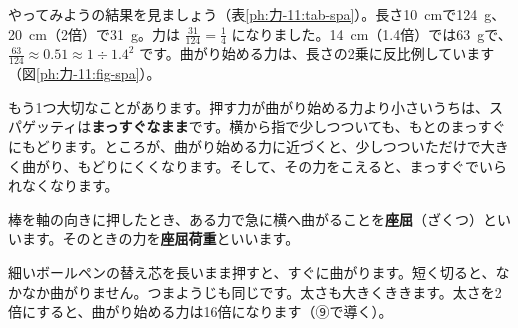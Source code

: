 

\label{ph:力-11:sec1}やってみようの結果を見ましょう（表\ref{ph:力-11:tab-spa}）。長さ\qty{10}{cm}で\qty{124}{g}、\qty{20}{cm}（2倍）で\qty{31}{g}。力は $\tfrac{31}{124}=\tfrac{1}{4}$ になりました。\qty{14}{cm}（1.4倍）では\qty{63}{g}で、$\tfrac{63}{124}\approx0.51\approx1\div1.4^2$ です。曲がり始める力は、長さの2乗に反比例しています（図\ref{ph:力-11:fig-spa}）。

\noindent\begin{minipage}[c]{0.50\linewidth}
もう1つ大切なことがあります。押す力が曲がり始める力より小さいうちは、スパゲッティは\textbf{まっすぐなまま}です。横から指で少しつついても、もとのまっすぐにもどります。ところが、曲がり始める力に近づくと、少しつついただけで大きく曲がり、もどりにくくなります。そして、その力をこえると、まっすぐでいられなくなります。

棒を軸の向きに押したとき、ある力で急に横へ曲がることを\textbf{座屈}（ざくつ）といいます。そのときの力を\textbf{座屈荷重}といいます。
\end{minipage}\hfill
\begin{minipage}[c]{0.46\linewidth}
\centering
{}
\label{ph:力-11:fig-spa}
\end{minipage}

\begin{phmijika}
細いボールペンの替え芯を長いまま押すと、すぐに曲がります。短く切ると、なかなか曲がりません。つまようじも同じです。太さも大きくききます。太さを2倍にすると、曲がり始める力は16倍になります（⑨で導く）。
\end{phmijika}

